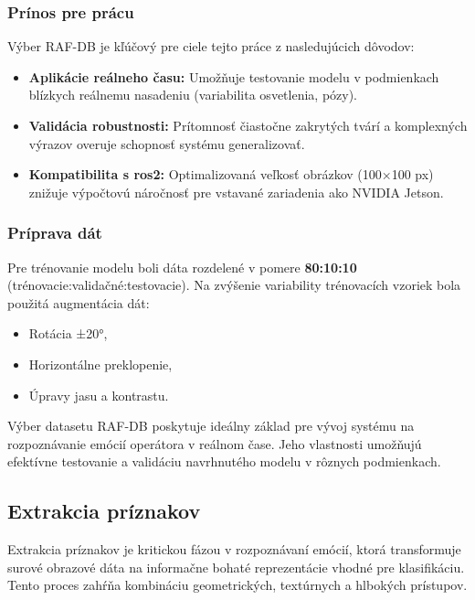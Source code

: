 \subsubsection{Prínos pre prácu}
Výber RAF-DB je kľúčový pre ciele tejto práce z nasledujúcich dôvodov:
\begin{itemize}
    \item \textbf{Aplikácie reálneho času:} Umožňuje testovanie modelu v podmienkach blízkych reálnemu nasadeniu (variabilita osvetlenia, pózy).
    \item \textbf{Validácia robustnosti:} Prítomnosť čiastočne zakrytých tvárí a komplexných výrazov overuje schopnosť systému generalizovať.
    \item \textbf{Kompatibilita s \gls{ros}2:} Optimalizovaná veľkosť obrázkov (100×100 px) znižuje výpočtovú náročnosť pre vstavané zariadenia ako NVIDIA Jetson.
\end{itemize}

\subsubsection{Príprava dát}
Pre trénovanie modelu boli dáta rozdelené v pomere \textbf{80:10:10} (trénovacie:validačné:testovacie). Na zvýšenie variability trénovacích vzoriek bola použitá augmentácia dát:
\begin{itemize}
    \item Rotácia ±20°,
    \item Horizontálne preklopenie,
    \item Úpravy jasu a kontrastu.
\end{itemize}

Výber datasetu RAF-DB poskytuje ideálny základ pre vývoj systému na rozpoznávanie emócií operátora v reálnom čase. Jeho vlastnosti umožňujú efektívne testovanie a validáciu navrhnutého modelu v rôznych podmienkach.

\subsection{Extrakcia príznakov}
Extrakcia príznakov je kritickou fázou v rozpoznávaní emócií, ktorá transformuje surové obrazové dáta na informačne bohaté reprezentácie vhodné pre klasifikáciu. Tento proces zahŕňa kombináciu geometrických, textúrnych a hlbokých prístupov.

